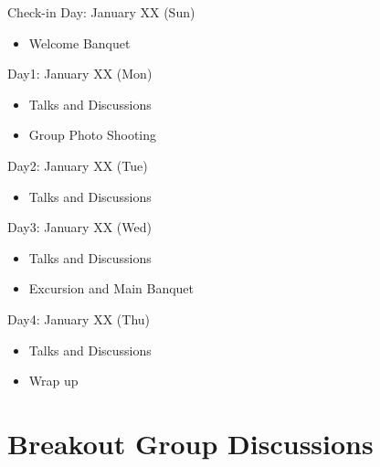 \documentclass[a4paper]{article}
\begin{document}
\begin{bfseries}
Check-in Day: January XX (Sun)
\end{bfseries}
\begin{itemize}
\item Welcome Banquet
\end{itemize}
\begin{bfseries}
{Day1: January XX (Mon)}
\end{bfseries}
\begin{itemize}
\item Talks and Discussions
\item Group Photo Shooting
\end{itemize}
\begin{bfseries}
Day2: January XX (Tue)
\end{bfseries}
\begin{itemize}
\item Talks and Discussions
\end{itemize}
\begin{bfseries}
Day3: January XX (Wed)
\end{bfseries}
\begin{itemize}
\item Talks and Discussions
\item Excursion and Main Banquet
\end{itemize}
\begin{bfseries}
Day4: January XX (Thu)
\end{bfseries}
\begin{itemize}
\item Talks and Discussions
\item Wrap up
\end{itemize}

\clearpage

\section{Breakout Group Discussions}
\end{document}
